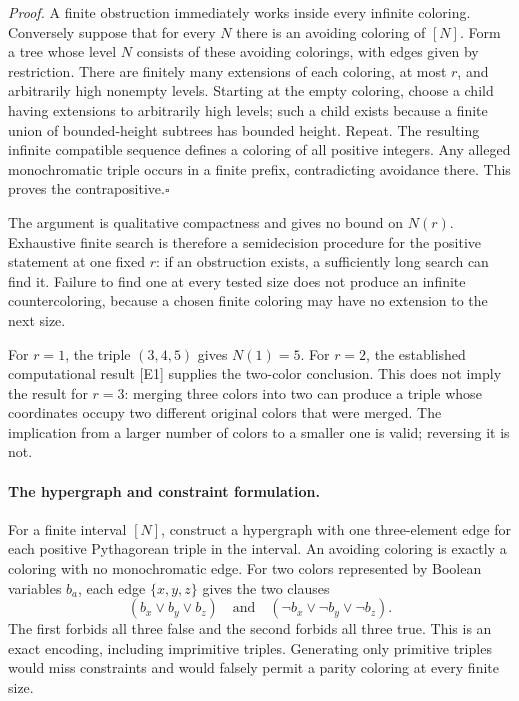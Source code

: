 \documentclass[11pt]{article}
\begin{document}
\emph{Proof.} A finite obstruction immediately works inside every infinite coloring. Conversely suppose that for every $N$ there is an avoiding coloring of $[N]$. Form a tree whose level $N$ consists of these avoiding colorings, with edges given by restriction. There are finitely many extensions of each coloring, at most $r$, and arbitrarily high nonempty levels. Starting at the empty coloring, choose a child having extensions to arbitrarily high levels; such a child exists because a finite union of bounded-height subtrees has bounded height. Repeat. The resulting infinite compatible sequence defines a coloring of all positive integers. Any alleged monochromatic triple occurs in a finite prefix, contradicting avoidance there. This proves the contrapositive.\hfill$\square$

The argument is qualitative compactness and gives no bound on $N(r)$. Exhaustive finite search is therefore a semidecision procedure for the positive statement at one fixed $r$: if an obstruction exists, a sufficiently long search can find it. Failure to find one at every tested size does not produce an infinite countercoloring, because a chosen finite coloring may have no extension to the next size.

For $r=1$, the triple $(3,4,5)$ gives $N(1)=5$. For $r=2$, the established computational result [E1] supplies the two-color conclusion. This does not imply the result for $r=3$: merging three colors into two can produce a triple whose coordinates occupy two different original colors that were merged. The implication from a larger number of colors to a smaller one is valid; reversing it is not.

\paragraph{The hypergraph and constraint formulation.}
For a finite interval $[N]$, construct a hypergraph with one three-element edge for each positive Pythagorean triple in the interval. An avoiding coloring is exactly a coloring with no monochromatic edge. For two colors represented by Boolean variables $b_a$, each edge $\{x,y,z\}$ gives the two clauses
\[
 (b_x\vee b_y\vee b_z)\quad\text{and}\quad
 (\neg b_x\vee\neg b_y\vee\neg b_z).
\]
The first forbids all three false and the second forbids all three true. This is an exact encoding, including imprimitive triples. Generating only primitive triples would miss constraints and would falsely permit a parity coloring at every finite size.
\end{document}
